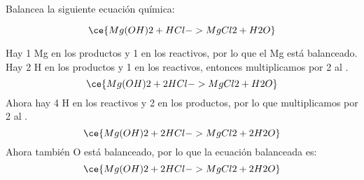 Balancea la siguiente ecuación química:

\[
    \ce{Mg(OH)2 + HCl -> MgCl2 + H2O}
\]

\begin{solutionbox}{6cm}
    Hay 1 Mg en los productos y 1 en los reactivos, por lo que el Mg está balanceado.
    Hay 2 H en los productos y 1 en los reactivos, entonces multiplicamos por 2 al .
    \[
        \ce{Mg(OH)2 + 2HCl -> MgCl2 + H2O}
    \]
    Ahora hay 4 H en los reactivos y 2 en los productos, por lo que multiplicamos por 2 al .
    \[
        \ce{Mg(OH)2 + 2HCl -> MgCl2 + 2H2O}
    \]
    Ahora también O está balanceado, por lo que la ecuación balanceada es:
    \[
        \ce{Mg(OH)2 + 2HCl -> MgCl2 + 2H2O}
    \]
\end{solutionbox}